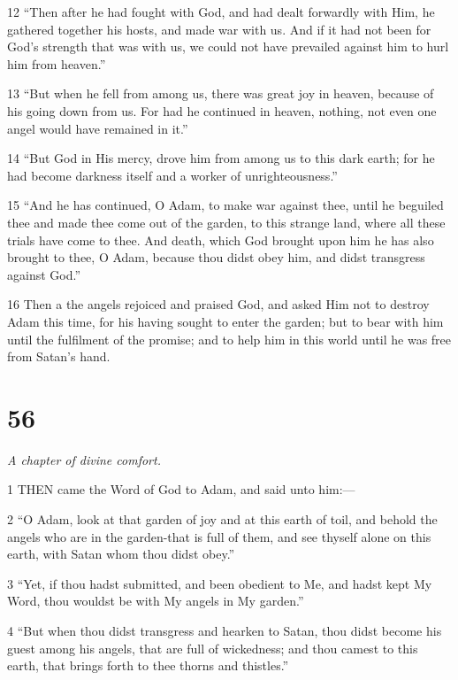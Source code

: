 \par 12 “Then after he had fought with God, and had dealt forwardly with Him, he gathered together his hosts, and made war with us. And if it had not been for God's strength that was with us, we could not have prevailed against him to hurl him from heaven.”

\par 13 “But when he fell from among us, there was great joy in heaven, because of his going down from us. For had he continued in heaven, nothing, not even one angel would have remained in it.”

\par 14 “But God in His mercy, drove him from among us to this dark earth; for he had become darkness itself and a worker of unrighteousness.”

\par 15 “And he has continued, O Adam, to make war against thee, until he beguiled thee and made thee come out of the garden, to this strange land, where all these trials have come to thee. And death, which God brought upon him he has also brought to thee, O Adam, because thou didst obey him, and didst transgress against God.”

\par 16 Then a the angels rejoiced and praised God, and asked Him not to destroy Adam this time, for his having sought to enter the garden; but to bear with him until the fulfilment of the promise; and to help him in this world until he was free from Satan's hand.

\chapter{56}

\par \textit{A chapter of divine comfort.}

\par 1 THEN came the Word of God to Adam, and said unto him:—

\par 2 “O Adam, look at that garden of joy and at this earth of toil, and behold the angels who are in the garden-that is full of them, and see thyself alone on this earth, with Satan whom thou didst obey.”

\par 3 “Yet, if thou hadst submitted, and been obedient to Me, and hadst kept My Word, thou wouldst be with My angels in My garden.”

\par 4 “But when thou didst transgress and hearken to Satan, thou didst become his guest among his angels, that are full of wickedness; and thou camest to this earth, that brings forth to thee thorns and thistles.”

